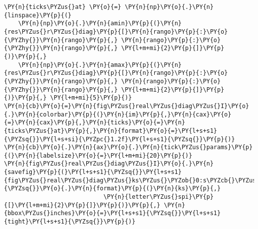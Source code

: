 \begin{Verbatim}[commandchars=\\\{\}]
\PY{n}{ticks\PYZus{}at} \PY{o}{=} \PY{n}{np}\PY{o}{.}\PY{n}{linspace}\PY{p}{(}
    \PY{n}{np}\PY{o}{.}\PY{n}{amin}\PY{p}{(}\PY{n}{res\PYZus{}r\PYZus{}diag}\PY{p}{[}\PY{n}{rango}\PY{p}{:}\PY{o}{\PYZhy{}}\PY{n}{rango}\PY{p}{,} \PY{n}{rango}\PY{p}{:}\PY{o}{\PYZhy{}}\PY{n}{rango}\PY{p}{,} \PY{l+m+mi}{2}\PY{p}{]}\PY{p}{)}\PY{p}{,}
    \PY{n}{np}\PY{o}{.}\PY{n}{amax}\PY{p}{(}\PY{n}{res\PYZus{}r\PYZus{}diag}\PY{p}{[}\PY{n}{rango}\PY{p}{:}\PY{o}{\PYZhy{}}\PY{n}{rango}\PY{p}{,} \PY{n}{rango}\PY{p}{:}\PY{o}{\PYZhy{}}\PY{n}{rango}\PY{p}{,} \PY{l+m+mi}{2}\PY{p}{]}\PY{p}{)}\PY{p}{,} \PY{l+m+mi}{5}\PY{p}{)}
\PY{n}{cb}\PY{o}{=}\PY{n}{fig\PYZus{}real\PYZus{}diag\PYZus{}I}\PY{o}{.}\PY{n}{colorbar}\PY{p}{(}\PY{n}{im}\PY{p}{,}\PY{n}{cax}\PY{o}{=}\PY{n}{cax}\PY{p}{,}\PY{n}{ticks}\PY{o}{=}\PY{n}{ticks\PYZus{}at}\PY{p}{,}\PY{n}{format}\PY{o}{=}\PY{l+s+s1}{\PYZsq{}}\PY{l+s+si}{\PYZpc{}1.2f}\PY{l+s+s1}{\PYZsq{}}\PY{p}{)}
\PY{n}{cb}\PY{o}{.}\PY{n}{ax}\PY{o}{.}\PY{n}{tick\PYZus{}params}\PY{p}{(}\PY{n}{labelsize}\PY{o}{=}\PY{l+m+mi}{20}\PY{p}{)}
\PY{n}{fig\PYZus{}real\PYZus{}diag\PYZus{}I}\PY{o}{.}\PY{n}{savefig}\PY{p}{(}\PY{l+s+s1}{\PYZsq{}}\PY{l+s+s1}{fig\PYZus{}real\PYZus{}diag\PYZus{}ks\PYZus{}\PYZob{}0:s\PYZcb{}\PYZus{}\PYZob{}1:s\PYZcb{}}\PY{l+s+s1}{\PYZsq{}}\PY{o}{.}\PY{n}{format}\PY{p}{(}\PY{n}{ks}\PY{p}{,}
                            \PY{n}{letter\PYZus{}spi}\PY{p}{[}\PY{l+m+mi}{2}\PY{p}{]}\PY{p}{)}\PY{p}{,} \PY{n}{bbox\PYZus{}inches}\PY{o}{=}\PY{l+s+s1}{\PYZsq{}}\PY{l+s+s1}{tight}\PY{l+s+s1}{\PYZsq{}}\PY{p}{)}
\end{Verbatim}

